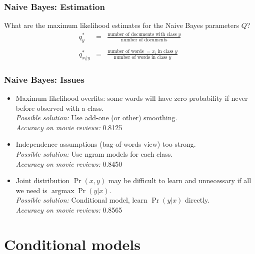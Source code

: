 \documentclass[ignorenonframetext,plain]{beamer}
\DeclareMathOperator*{\argmax}{argmax}
\begin{document}
\begin{frame}\frametitle{Naive Bayes: Estimation}
What are the maximum likelihood estimates for the Naive Bayes
parameters $Q$?\begin{eqnarray*}
q_y^* &=& \frac{\mbox{number of documents with class
    $y$}}{\mbox{number of documents}}\\
\\
q_{x_i|y}^* &=& \frac{\mbox{number of words $=x_i$ in class
    $y$}}{\mbox{number of words in class $y$}}
\end{eqnarray*}  
\end{frame}

\begin{frame}\frametitle{Naive Bayes: Issues}
\begin{itemize}
\item Maximum likelihood overfits: some words will have zero
  probability if never before observed with a class.
  \\ \textsl{Possible solution:} Use add-one (or other) smoothing.
  \\ \textsl{Accuracy on movie reviews:} 0.8125
\item Independence assumptions (bag-of-words view) too strong.
  \\ \textsl{Possible solution:} Use ngram models for each class.
  \\ \textsl{Accuracy on movie reviews:} 0.8450
\item Joint distribution $\Pr(x,y)$ may be difficult to learn and
  unnecessary if all we need is $\argmax\Pr(y|x)$.
  \\ \textsl{Possible solution:} Conditional model, learn
  $\Pr(y|x)$ directly.
  \\ \textsl{Accuracy on movie reviews:} 0.8565
\end{itemize}
\end{frame}

\section{Conditional models}
\frame{\sectionpage}
\end{document}
